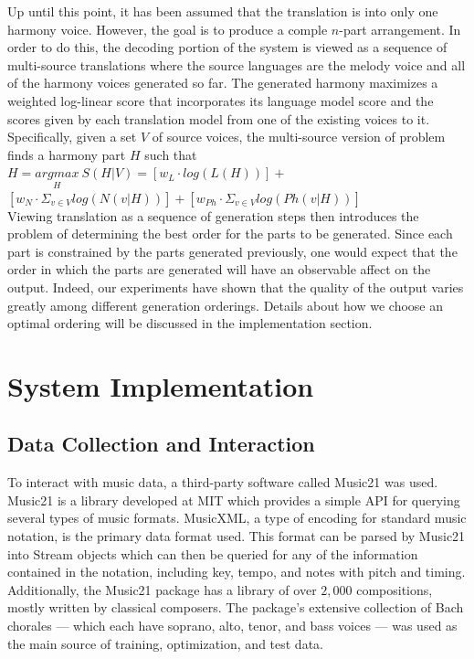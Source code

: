 \documentclass{sig-alternate}
\begin{document}
Up until this point, it has been assumed that the translation is into only one harmony voice. However, the goal is to produce a comple $n$-part arrangement. In order to do this, the decoding portion of the system is viewed as a sequence of multi-source translations where the source languages are the melody voice and all of the harmony voices generated so far. The generated harmony maximizes a weighted log-linear score that incorporates its language model score and the scores given by each translation model from one of the existing voices to it. Specifically, given a set $V$ of source voices, the multi-source version of problem finds a harmony part $H$ such that\\

$H = \underset{H}{argmax}\ S(H | V) = [w_{L}\cdot log(L(H))] + $\\

$[w_{N}\cdot \Sigma_{v \in V} log(N(v | H))] + [w_{Ph}\cdot \Sigma_{v \in V} log(Ph(v | H))]$\\

Viewing translation as a sequence of generation steps then introduces the problem of determining the best order for the parts to be generated. Since each part is constrained by the parts generated previously, one would expect that the order in which the parts are generated will have an observable affect on the output. Indeed, our experiments have shown that the quality of the output varies greatly among different generation orderings. Details about how we choose an optimal ordering will be discussed in the implementation section.

\section{System Implementation}
\label{sec:sys_implement}
\subsection{Data Collection and Interaction}
To interact with music data, a third-party software called Music21\cite{Cuthbert_music21:a} was used. Music21 is a library developed at MIT which provides a simple API for querying several types of music formats.  MusicXML, a type of encoding for standard music notation, is the primary data format used. This format can be parsed by Music21 into Stream objects which can then be queried for any of the information contained in the notation, including key, tempo, and notes with pitch and timing. Additionally, the Music21 package has a library of over $2,000$ compositions, mostly written by classical composers. The package's extensive collection of Bach chorales --- which each have soprano, alto, tenor, and bass voices --- was used as the main source of training, optimization, and test data. 
\end{document}
